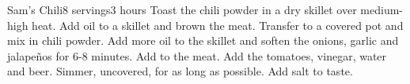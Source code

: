 \begin{recipe}{Sam's Chili}{8 servings}{3 hours}
Toast the chili powder in a dry skillet over medium-high heat.
Add oil to a skillet and brown the meat.  Transfer to a covered pot and mix in chili powder.
Add more oil to the skillet and soften the onions, garlic and jalape\~{n}os for 6-8 minutes.  Add to the meat.
Add the tomatoes, vinegar, water and beer.  Simmer, uncovered, for as long as possible.  Add salt to taste.
\end{recipe}
